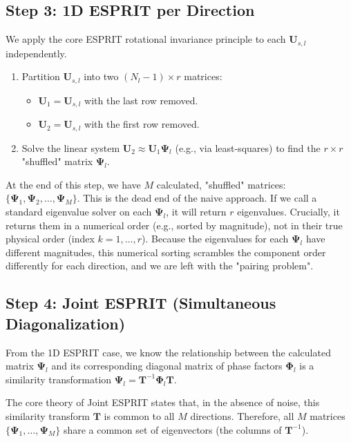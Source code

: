 \subsection{Step 3: 1D ESPRIT per Direction}
We apply the core ESPRIT rotational invariance principle to each $\mathbf{U}_{s,l}$ independently.
\begin{enumerate}
    \item Partition $\mathbf{U}_{s,l}$ into two $(N_l-1) \times r$ matrices:
        \begin{itemize}
            \item $\mathbf{U}_1 = \mathbf{U}_{s,l}$ with the last row removed.
            \item $\mathbf{U}_2 = \mathbf{U}_{s,l}$ with the first row removed.
        \end{itemize}
    \item Solve the linear system $\mathbf{U}_2 \approx \mathbf{U}_1 \mathbf{\Psi}_l$ (e.g., via least-squares) to find the $r \times r$ "shuffled" matrix $\mathbf{\Psi}_l$.
\end{enumerate}
At the end of this step, we have $M$ calculated, "shuffled" matrices: $\{\mathbf{\Psi}_1, \mathbf{\Psi}_2, \dots, \mathbf{\Psi}_M\}$.
This is the dead end of the naive approach. If we call a standard eigenvalue solver on each $\mathbf{\Psi}_l$, it will return $r$ eigenvalues.
Crucially, it returns them in a numerical order (e.g., sorted by magnitude), not in their true physical order (index $k=1, \dots, r$).
Because the eigenvalues for each $\mathbf{\Psi}_l$ have different magnitudes, this numerical sorting scrambles the component order differently for each direction, and we are left with the "pairing problem".

\subsection{Step 4: Joint ESPRIT (Simultaneous Diagonalization)}
From the 1D ESPRIT case, we know the relationship between the calculated matrix $\mathbf{\Psi}_l$ and its corresponding diagonal matrix of phase factors $\mathbf{\Phi}_l$ is a similarity transformation $\mathbf{\Psi}_l = \mathbf{T}^{-1}\mathbf{\Phi}_l \mathbf{T}$.

The core theory of Joint ESPRIT states that, in the absence of noise, this similarity transform $\mathbf{T}$ is common to all $M$ directions. Therefore, all $M$ matrices $\{\mathbf{\Psi}_1, \dots, \mathbf{\Psi}_M\}$ share a common set of eigenvectors (the columns of $\mathbf{T}^{-1}$).

